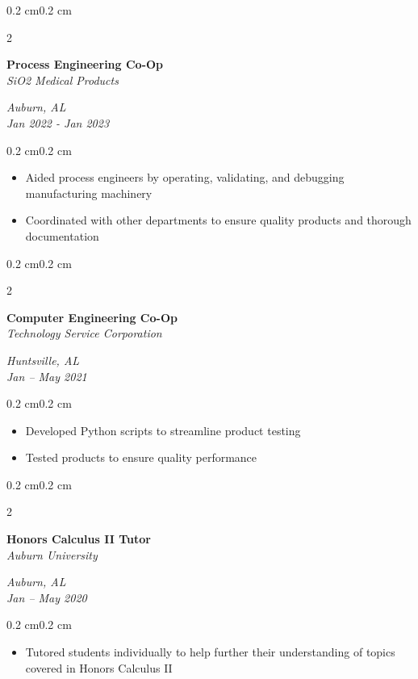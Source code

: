 \documentclass[10pt, letterpaper]{article}
\newenvironment{highlights}{
    \begin{itemize}[topsep=0.10 cm,parsep=0.10 cm,partopsep=0pt,itemsep=0pt,leftmargin=0.4 cm + 10pt]
}{
    \end{itemize}
}
\newenvironment{onecolentry}{
    \begin{adjustwidth}{0.2 cm}{0.2 cm}
}{
    \end{adjustwidth}
}
\newenvironment{twocolentry}[2][]{
    \onecolentry
    \def\secondColumn{#2}
    \setcolumnwidth{\fill, 4.5 cm}
    \begin{paracol}{2}
}{
    \switchcolumn \raggedleft \secondColumn
    \end{paracol}
    \endonecolentry
}
\begin{document}
        \begin{twocolentry}{\textit{Auburn, AL} \\ \textit{Jan 2022 - Jan 2023}}
            \textbf{Process Engineering Co-Op} \\
            \textit{SiO2 Medical Products}
        \end{twocolentry}
        \vspace{0.10 cm}
        \begin{onecolentry}
            \begin{highlights}
                \item Aided process engineers by operating, validating, and debugging manufacturing machinery
                \item Coordinated with other departments to ensure quality products and thorough documentation
            \end{highlights}
        \end{onecolentry}

        \vspace{0.2 cm}

        \begin{twocolentry}{\textit{Huntsville, AL} \\ \textit{Jan – May 2021}}
            \textbf{Computer Engineering Co-Op} \\
            \textit{Technology Service Corporation}
        \end{twocolentry}
        \vspace{0.10 cm}
        \begin{onecolentry}
            \begin{highlights}
                \item Developed Python scripts to streamline product testing
                \item Tested products to ensure quality performance
            \end{highlights}
        \end{onecolentry}

        \vspace{0.2 cm}

        \begin{twocolentry}{\textit{Auburn, AL} \\ \textit{Jan – May 2020}}
            \textbf{Honors Calculus II Tutor} \\
            \textit{Auburn University}
        \end{twocolentry}
        \vspace{0.10 cm}
        \begin{onecolentry}
            \begin{highlights}
                \item Tutored students individually to help further their understanding of topics covered in Honors Calculus II
            \end{highlights}
        \end{onecolentry}
\end{document}
